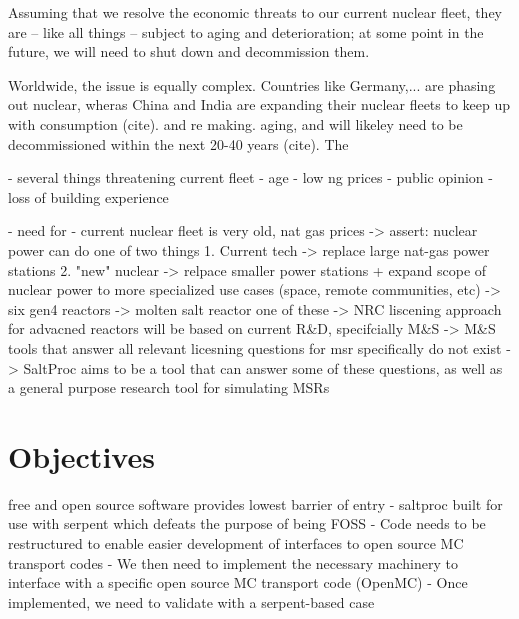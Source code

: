 Assuming that we resolve the economic threats to our current nuclear fleet, they are -- like all things -- subject to aging and deterioration; at some point in the future, we will need to shut down and decommission them.



Worldwide, the issue is equally complex. Countries like Germany,... are phasing out nuclear, wheras China and India are expanding their nuclear fleets to keep up with consumption (cite). and re making. aging, and will likeley need to be decommissioned within the next 20-40 years (cite). The 

- several things threatening current fleet
  - age
  - low ng prices
  - public opinion
  - loss of building experience

- need for 
- current nuclear fleet is very old, nat gas prices
 -> assert: nuclear power can do one of two things
    1. Current tech -> replace large nat-gas power stations 
    2. "new" nuclear -> relpace smaller power stations + expand scope
        of nuclear power to more specialized use cases (space, remote communities, etc)
-> six gen4 reactors -> molten salt reactor one of these
-> NRC liscening approach for advacned reactors will be based on current R\&D, specifcially M\&S
-> M\&S tools that answer all relevant licesning questions for msr specifically do not exist
-> SaltProc aims to be a tool that can answer some of these questions, as well as a general purpose
    research tool for simulating MSRs

\section{Objectives}%
\label{sec:objectives}

 free and open source software provides lowest barrier of entry
 - saltproc built for use with serpent which defeats the purpose of being
    FOSS
 - Code needs to be restructured to enable easier development of interfaces to 
 open source MC transport codes
 - We then need to implement the necessary machinery to interface with a specific
    open source MC transport code (OpenMC)
 - Once implemented, we need to validate with a serpent-based case
